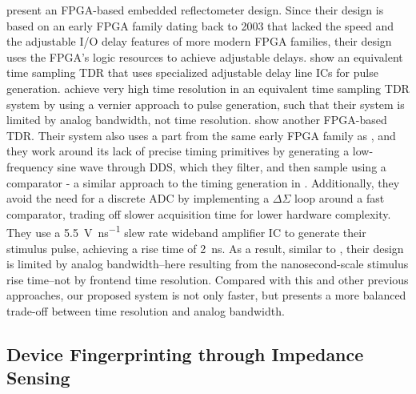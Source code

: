 \documentclass[final]{iacrtrans}
\begin{document}
\textcite{bencivenniTimeDomainReflectometer2013} present an FPGA-based embedded reflectometer design. Since their design
is based on an early FPGA family dating back to 2003 that lacked the speed and the adjustable I/O delay features of more
modern FPGA families, their design uses the FPGA's logic resources to achieve adjustable delays.
\textcite{negreaSequentialSamplingTime2009} show an equivalent time sampling TDR that uses specialized adjustable delay
line ICs for pulse generation. \textcite{lee16psresolutionRandomEquivalent2003} achieve very high time resolution in an
equivalent time sampling TDR system by using a vernier approach to pulse generation, such that their system is limited
by analog bandwidth, not time resolution. \textcite{trebbelsMiniaturizedFPGABasedHighResolution2013} show another
FPGA-based TDR. Their system also uses a part from the same early FPGA family as
\textcite{bencivenniTimeDomainReflectometer2013}, and they work around its lack of precise timing primitives by
generating a low-frequency sine wave through DDS, which they filter, and then sample using a comparator - a similar
approach to the timing generation in \textcite{houtman1GHzSamplingOscilloscope2000}. Additionally, they avoid the need
for a discrete ADC by implementing a $\Delta\Sigma$ loop around a fast comparator, trading off slower acquisition time
for lower hardware complexity. They use a \qty{5.5}{\volt\per\nano\second} slew rate wideband amplifier IC to generate
their stimulus pulse, achieving a rise time of \qty{2}{\nano\second}. As a result, similar to
\textcite{lee16psresolutionRandomEquivalent2003}, their design is limited by analog bandwidth--here resulting from the
nanosecond-scale stimulus rise time--not by frontend time resolution. Compared with this and other previous approaches,
our proposed system is not only faster, but presents a more balanced trade-off between time resolution and analog
bandwidth.

\subsection{Device Fingerprinting through Impedance Sensing}
\end{document}
